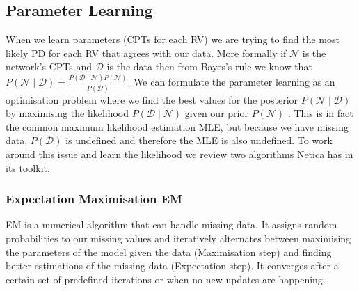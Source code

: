 \documentclass{UoYCSproject}
\begin{document}
\subsection{Parameter Learning}
\label{subsec:param_learning}
When we learn parameters (CPTs for each RV) we are trying to find the most likely PD for each RV that agrees with our data. More formally if \(\mathcal{N}\) is the network's CPTs and \(\mathcal{D}\) is the data then from Bayes's rule we know that \(P(\mathcal{N} \mid \mathcal{D}) = \frac{P(\mathcal{D} \mid \mathcal{N})P(\mathcal{N})}{P(\mathcal{D})}\). We can formulate the parameter learning as an optimisation problem where we find the best values for the posterior \(P(\mathcal{N} \mid \mathcal{D})\) by maximising the likelihood \(P(\mathcal{D} \mid \mathcal{N})\) given our prior \(P(\mathcal{N})\) \parencite[46-48]{neticaCman}. This is in fact the common maximum likelihood estimation MLE, but because we have missing data, \(P(\mathcal{D})\) is undefined and therefore the MLE is also undefined. To work around this issue and learn the likelihood we review two algorithms Netica has in its toolkit.
 

\subsubsection{Expectation Maximisation EM}
EM \parencite{EMAlgorithm} is a numerical algorithm that can handle missing data. It assigns random probabilities to our missing values and iteratively alternates between maximising the parameters of the model given the data (Maximisation step) and finding better estimations of the missing data (Expectation step). It converges after a certain set of predefined iterations or when no new updates are happening. 
\end{document}
